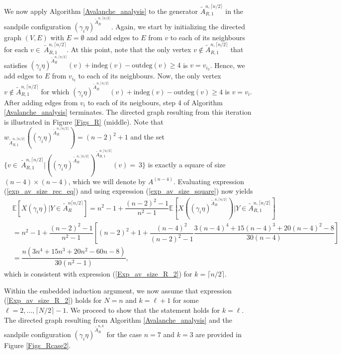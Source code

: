 \documentclass{article}
\begin{document}
    We now apply Algorithm \ref{Avalanche_analysis} to the generator $\tilde{A}^{n,\lceil n/2 \rceil}_{R,1}$ in the sandpile configuration $(\gamma_i \eta)^{\tilde{A}_R^{n,\lceil n/2 \rceil}}$. Again, we start by initializing the directed graph $(V, E)$ with $E = \emptyset$ and add edges to $E$ from $v$ to each of its neighbours for each $v \in~\tilde{A}^{n,\lceil n/2 \rceil}_{R,1}$. At this point, note that the only vertex $v \notin \tilde{A}^{n,\lceil n/2 \rceil}_{R,1}$ that satisfies $(\gamma_i \eta)^{\tilde{A}_R^{n,\lceil n/2 \rceil}}(v) + \text{indeg}(v) - \text{outdeg}(v) \geq 4$ is $v = v_{i_3}$. Hence, we add edges to $E$ from $v_{i_3}$ to each of its neighbours. Now, the only vertex $v \notin \tilde{A}^{n,\lceil n/2 \rceil}_{R,1}$ for which $(\gamma_i \eta)^{\tilde{A}_R^{n,\lceil n/2 \rceil}}(v) + \text{indeg}(v) - \text{outdeg}(v) \geq 4$ is $v = v_i$. After adding edges from $v_i$ to each of its neigbours, step 4 of Algorithm \ref{Avalanche_analysis} terminates. The directed graph resulting from this iteration is illustrated in Figure \ref{Figs_R} (middle). Note that $w_{\tilde{A}^{n,\lceil n/2 \rceil}_{R,1}}((\gamma_i \eta)^{\tilde{A}_R^{n,\lceil n/2 \rceil}}) = (n-2)^2 +1$ and the set $\{v \in~\tilde{A}^{n,\lceil n/2 \rceil}_{R,1}|((\gamma_i \eta)^{\tilde{A}_R^{n,\lceil n/2 \rceil}})^{\tilde{A}^{n,\lceil n/2 \rceil}_{R,1}}(v) =~3\}$ is exactly a square of size $(n-4) \times (n-4)$, which we will denote by $A^{(n-4)}$. Evaluating expression (\ref{exp_av_size_rec_eq}) and using expression (\ref{exp_av_size_square}) now yields
    \begin{align*}
        &\mathbb{E}[X(\gamma_i \eta)|Y \in \tilde{A}^{n \lceil n/2 \rceil}_R] = n^2 -1 + \dfrac{(n-2)^2-1}{n^2-1} \mathbb{E}[X((\gamma_i \eta)^{\tilde{A}_R^{n, \lceil n/2 \rceil}})|Y \in \tilde{A}^{n,\lceil n/2 \rceil}_{R,1}] \\
        &= n^2 - 1 + \dfrac{(n-2)^2-1}{n^2-1}\left[(n-2)^2+1 + \dfrac{(n-4)^2}{(n-2)^2-1} \dfrac{3(n-4)^4+15(n-4)^3 + 20(n-4)^2-8}{30(n-4)}\right]\\
        &= \dfrac{n(3n^4+15n^3+20n^2-60n-8)}{30(n^2-1)},
    \end{align*}
    which is consistent with expression (\ref{Exp_av_size_R_2}) for $k = \lceil n/2 \rceil$. 

    Within the embedded induction argument, we now assume that expression (\ref{Exp_av_size_R_2}) holds for $N = n$ and $k = \ell + 1$ for some $\ell = 2, \ldots, \lceil N/2 \rceil -1$. We proceed to show that the statement holds for $k = \ell$. The directed graph resulting from Algorithm \ref{Avalanche_analysis} and the sandpile configuration $(\gamma_i \eta)^{\tilde{A}_R^{n, k}}$ for the case $n = 7$ and $k = 3$ are provided in Figure \ref{Figs_Rcase2}.
\end{document}
